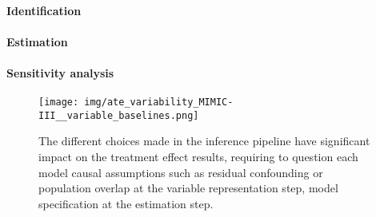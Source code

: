 
\paragraph{Identification}

\paragraph{Estimation}

\paragraph{Sensitivity analysis}


\begin{figure}
  \centering
  \texttt{[image: img/ate\_variability\_MIMIC-III\_\_variable\_baselines.png]}
  \caption{The different choices made in the inference pipeline have significant
    impact on the treatment effect results, requiring to question each model
    causal assumptions such as residual confounding or population overlap at the variable representation
    step, model specification at the estimation step.}
\end{figure}
